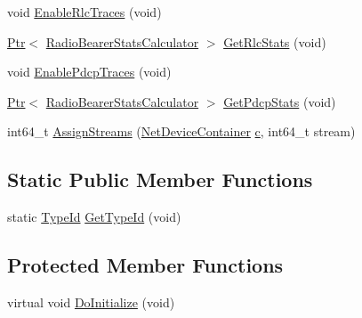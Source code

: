 \begin{DoxyCompactItemize}
\item 
void \hyperlink{classns3_1_1LteHelper_abadfdd04d30b261e9b6f0846b4784928}{Enable\+Rlc\+Traces} (void)
\item 
\hyperlink{classns3_1_1Ptr}{Ptr}$<$ \hyperlink{classns3_1_1RadioBearerStatsCalculator}{Radio\+Bearer\+Stats\+Calculator} $>$ \hyperlink{classns3_1_1LteHelper_a6eb438ccf69642e3863adea4991fa2ca}{Get\+Rlc\+Stats} (void)
\item 
void \hyperlink{classns3_1_1LteHelper_adc62a53efe0437cf09062c9d6a95af3d}{Enable\+Pdcp\+Traces} (void)
\item 
\hyperlink{classns3_1_1Ptr}{Ptr}$<$ \hyperlink{classns3_1_1RadioBearerStatsCalculator}{Radio\+Bearer\+Stats\+Calculator} $>$ \hyperlink{classns3_1_1LteHelper_a1017c1f2ee9f5a640c50c25161a57758}{Get\+Pdcp\+Stats} (void)
\item 
int64\+\_\+t \hyperlink{classns3_1_1LteHelper_ae90d941582aa49a1b28c9301ece35b07}{Assign\+Streams} (\hyperlink{classns3_1_1NetDeviceContainer}{Net\+Device\+Container} \hyperlink{mmwave_2model_2fading-traces_2fading__trace__generator_8m_ae0323a9039add2978bf5b49550572c7c}{c}, int64\+\_\+t stream)
\end{DoxyCompactItemize}
\subsection*{Static Public Member Functions}
\begin{DoxyCompactItemize}
\item 
static \hyperlink{classns3_1_1TypeId}{Type\+Id} \hyperlink{classns3_1_1LteHelper_ac146ee7a17ca2be436dd4fd2345a6715}{Get\+Type\+Id} (void)
\end{DoxyCompactItemize}
\subsection*{Protected Member Functions}
\begin{DoxyCompactItemize}
\item 
virtual void \hyperlink{classns3_1_1LteHelper_a4acf9e9b86dc00f643a54d3e34b4c315}{Do\+Initialize} (void)
\end{DoxyCompactItemize}
